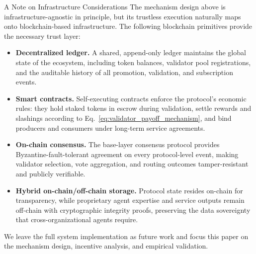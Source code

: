 \begin{remarkbox}{A Note on Infrastructure Considerations}
\label{sec:decentral_tech}
The mechanism design above is infrastructure-agnostic in principle, but its trustless execution naturally maps onto blockchain-based infrastructure. 
The following blockchain primitives provide the necessary trust layer:
\begin{itemize}[leftmargin=1.5em, itemsep=3pt, topsep=3pt]
    \item \textbf{Decentralized ledger.} A shared, append-only ledger maintains the global state of the ecosystem, including token balances, validator pool registrations, and the auditable history of all promotion, validation, and subscription events.
    \item \textbf{Smart contracts.} Self-executing contracts enforce the protocol's economic rules: they hold staked tokens in escrow during validation, settle rewards and slashings according to Eq.~\eqref{eq:validator_payoff_mechanism}, and bind producers and consumers under long-term service agreements.
    \item \textbf{On-chain consensus.} The base-layer consensus protocol provides Byzantine-fault-tolerant agreement on every protocol-level event, making validator selection, vote aggregation, and routing outcomes tamper-resistant and publicly verifiable.
    \item \textbf{Hybrid on-chain/off-chain storage.} Protocol state resides on-chain for transparency, while proprietary agent expertise and service outputs remain off-chain with cryptographic integrity proofs, preserving the data sovereignty that cross-organizational agents require.
\end{itemize}
We leave the full system implementation as future work and focus this paper on the mechanism design, incentive analysis, and empirical validation.
\end{remarkbox}

